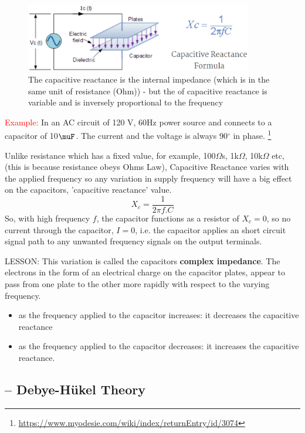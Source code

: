\begin{figure}[hbt]
  \centerline{\includegraphics[height=3cm,
    angle=0]{./images/capacitive-reactance.eps}}
  \caption{The capacitive reactance is the internal impedance (which is in
  the same unit of resistance (Ohm)) - but the of capacitive reactance is
  variable and is inversely proportional to the frequency}
  \label{fig:capacitive-reactance}
\end{figure}

\textcolor{red}{Example:} In an AC circuit of 120 V, 60Hz power source and
connects to a capacitor of 10$\muF$. The current and the voltage is always
90$^\circ$ in phase.
\footnote{\url{https://www.myodesie.com/wiki/index/returnEntry/id/3074}}

Unlike resistance which has a fixed value, for example, 100$\Omega$s,
1k$\Omega$, 10k$\Omega$ etc, (this is because resistance obeys Ohms Law),
Capacitive Reactance varies with the applied frequency so any variation in
supply frequency will have a big effect on the capacitors, 'capacitive
reactance' value. 
\begin{equation}
X_c = \frac{1}{2\pi f.C}
\end{equation}
So, with high frequency $f$, the capacitor functions as a resistor of
$X_c = 0$, so no current through the capacitor, $I=0$, i.e. the capacitor
applies an short circuit signal path to any unwanted frequency signals on the
output terminals. 


LESSON: This variation is called the capacitors {\bf complex impedance}.
The electrons in the form of an electrical charge on the capacitor plates,
appear to pass from one plate to the other more rapidly with respect to the
varying frequency.
\begin{itemize}
  \item as  the frequency applied to the capacitor increases: it decreases the
  capacitive reactance
  \item as  the frequency applied to the capacitor decreases: it increases the
  capacitive reactance.
  
\end{itemize}

\subsection{-- Debye-H\"ukel Theory}
\label{sec:debye-hukel-theory}

